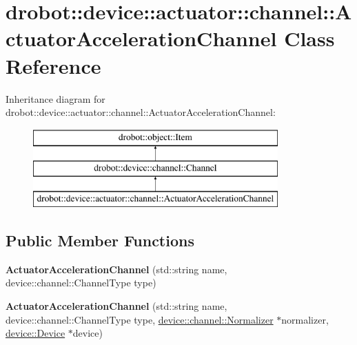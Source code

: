 \hypertarget{classdrobot_1_1device_1_1actuator_1_1channel_1_1ActuatorAccelerationChannel}{\section{drobot\-:\-:device\-:\-:actuator\-:\-:channel\-:\-:Actuator\-Acceleration\-Channel Class Reference}
\label{classdrobot_1_1device_1_1actuator_1_1channel_1_1ActuatorAccelerationChannel}
}
Inheritance diagram for drobot\-:\-:device\-:\-:actuator\-:\-:channel\-:\-:Actuator\-Acceleration\-Channel\-:\begin{figure}[H]
\begin{center}
\leavevmode
\includegraphics[height=3.000000cm]{classdrobot_1_1device_1_1actuator_1_1channel_1_1ActuatorAccelerationChannel}
\end{center}
\end{figure}
\subsection*{Public Member Functions}
\begin{DoxyCompactItemize}
\item 
\hypertarget{classdrobot_1_1device_1_1actuator_1_1channel_1_1ActuatorAccelerationChannel_a047d46d5d7695c45d6ba282a1fe50ec5}{{\bfseries Actuator\-Acceleration\-Channel} (std\-::string name, device\-::channel\-::\-Channel\-Type type)}\label{classdrobot_1_1device_1_1actuator_1_1channel_1_1ActuatorAccelerationChannel_a047d46d5d7695c45d6ba282a1fe50ec5}

\item 
\hypertarget{classdrobot_1_1device_1_1actuator_1_1channel_1_1ActuatorAccelerationChannel_a99382509919e221b7623ab632736a19d}{{\bfseries Actuator\-Acceleration\-Channel} (std\-::string name, device\-::channel\-::\-Channel\-Type type, \hyperlink{classdrobot_1_1device_1_1channel_1_1Normalizer}{device\-::channel\-::\-Normalizer} $\ast$normalizer, \hyperlink{classdrobot_1_1device_1_1Device}{device\-::\-Device} $\ast$device)}\label{classdrobot_1_1device_1_1actuator_1_1channel_1_1ActuatorAccelerationChannel_a99382509919e221b7623ab632736a19d}

\end{DoxyCompactItemize}
